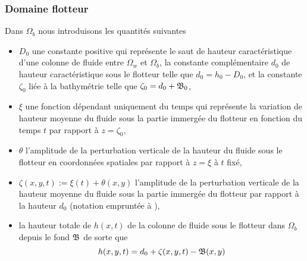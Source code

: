 \subsubsection{Domaine flotteur}
Dans $\Omega_b$ nous introduisons les quantités suivantes
\begin{itemize}[label=$\mybullet$]
	\item $D_0$ une constante positive qui représente le saut de hauteur caractéristique d'une colonne de fluide entre $\Omega_w$ et $\Omega_b$, la constante complémentaire $d_0$ de hauteur caractéristique sous le flotteur telle que $d_0 = h_0 - D_0$, et la constante $\zeta_0$ liée à la bathymétrie telle que  $\zeta_0 = d_0 + \mathfrak{B}_0$, 
	\item $\xi$ une fonction dépendant uniquement du temps qui représente la variation de hauteur moyenne du fluide sous la partie immergée du flotteur en fonction du temps $t$ par rapport à $z=\zeta_0$, 
	\item $\theta$ l'amplitude de la perturbation verticale de la hauteur du fluide sous le flotteur en coordonnées spatiales par rapport à $z=\xi$ à $t$ fixé,
	\item $\zeta (x, y, t) := \xi (t) + \theta(x, y)$ l'amplitude de la perturbation verticale de la hauteur moyenne du fluide sous la partie immergée du flotteur par rapport à la hauteur $d_0$ (notation empruntée à \citet{bosi_spectral_2019}),
	\item la hauteur totale de $h(x, t)$ de la colonne de fluide sous le flotteur dans $\Omega_b$ depuis le fond $\mathfrak{B}$ de sorte que
	\begin{equation*}
		h(x, y, t) = d_0 + \zeta(x, y, t) - \mathfrak{B}(x, y)
	\end{equation*}
\end{itemize}


